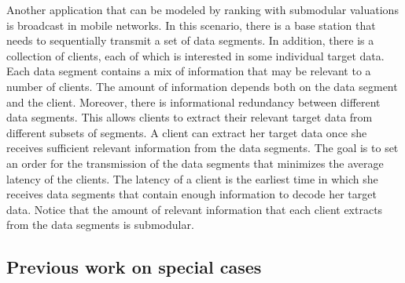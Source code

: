 \documentclass[11pt]{article}
\theoremstyle{plain}
\theoremstyle{definition}
\begin{document}
\smallskip {} Another
application that can be modeled by ranking with submodular
valuations is broadcast in mobile networks. In this scenario,
there is a base station that needs to sequentially transmit a set
of  data segments. In addition, there is a collection of 
clients, each of which is interested in some individual target
data. Each data segment contains a mix of information that may be
relevant to a number of clients. The amount of information depends
both on the data segment and the client. Moreover, there is
informational redundancy between different data segments. This
allows clients to extract their relevant target data from
different subsets of segments. A client can extract her target
data once she receives sufficient relevant information from the
data segments. The goal is to set an order for the transmission of
the data segments that minimizes the average latency of the
clients. The latency of a client is the earliest time in which she
receives data segments that contain enough information to decode
her target data. Notice that the amount of relevant information
that each client extracts from the data segments is submodular.


\subsection{Previous work on special cases}
\end{document}
